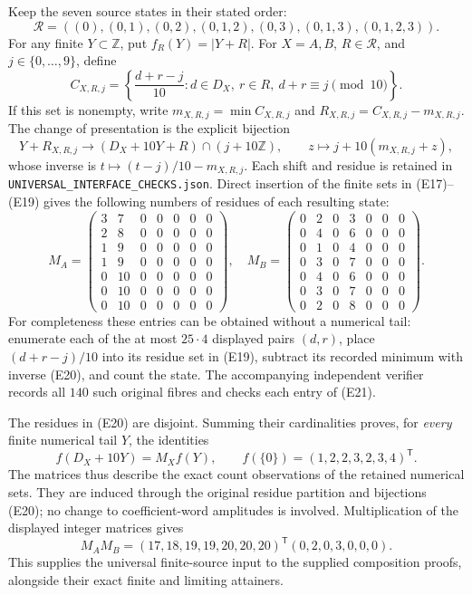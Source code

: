 \documentclass[11pt]{article}
\newcommand{\Z}{\mathbb Z}
\begin{document}
Keep the seven source states in their stated order:
\[
 \mathcal R=((0),(0,1),(0,2),(0,1,2),(0,3),(0,1,3),(0,1,2,3)).
 \tag{E18}
\]
For any finite \(Y\subset\Z\), put \(f_R(Y)=|Y+R|\).  For
\(X=A,B\), \(R\in\mathcal R\), and \(j\in\{0,\ldots,9\}\), define
\[
 C_{X,R,j}
  =\left\{\frac{d+r-j}{10}:
        d\in D_X,\ r\in R,\ d+r\equiv j\pmod {10}\right\}.
 \tag{E19}
\]
If this set is nonempty, write \(m_{X,R,j}=\min C_{X,R,j}\) and
\(R_{X,R,j}=C_{X,R,j}-m_{X,R,j}\).
The change of presentation is the explicit bijection
\[
 Y+R_{X,R,j}\longrightarrow
 (D_X+10Y+R)\cap(j+10\Z),\qquad
 z\longmapsto j+10(m_{X,R,j}+z),
 \tag{E20}
\]
whose inverse is \(t\mapsto(t-j)/10-m_{X,R,j}\).  Each shift and
residue is retained in \texttt{UNIVERSAL\_INTERFACE\_CHECKS.json}.
Direct insertion of the finite sets in (E17)--(E19) gives the following
numbers of residues of each resulting state:
\[
 M_A=\begin{pmatrix}
3&7&0&0&0&0&0\\2&8&0&0&0&0&0\\1&9&0&0&0&0&0\\
1&9&0&0&0&0&0\\0&10&0&0&0&0&0\\0&10&0&0&0&0&0\\
0&10&0&0&0&0&0
\end{pmatrix},
\quad
 M_B=\begin{pmatrix}
0&2&0&3&0&0&0\\0&4&0&6&0&0&0\\0&1&0&4&0&0&0\\
0&3&0&7&0&0&0\\0&4&0&6&0&0&0\\0&3&0&7&0&0&0\\
0&2&0&8&0&0&0
\end{pmatrix}.
 \tag{E21}
\]
For completeness these entries can be obtained without a numerical tail:
enumerate each of the at most \(25\cdot4\) displayed pairs \((d,r)\),
place \((d+r-j)/10\) into its residue set in (E19), subtract its recorded
minimum with inverse (E20), and count the state.  The accompanying
independent verifier records all \(140\) such original fibres and
checks each entry of (E21).

The residues in (E20) are disjoint.  Summing their cardinalities proves,
for \emph{every} finite numerical tail \(Y\), the identities
\[
 f(D_X+10Y)=M_Xf(Y),\qquad
 f(\{0\})=(1,2,2,3,2,3,4)^{\mathsf T}.
 \tag{E22}
\]
The matrices thus describe the exact count observations of the retained
numerical sets.  They are induced through the original residue partition
and bijections (E20); no change to coefficient-word amplitudes is involved.
Multiplication of the displayed integer matrices gives
\[
 M_AM_B=(17,18,19,19,20,20,20)^{\mathsf T}(0,2,0,3,0,0,0).
 \tag{E23}
\]
This supplies the universal finite-source input to the supplied
composition proofs, alongside their exact finite and limiting attainers.
\end{document}
